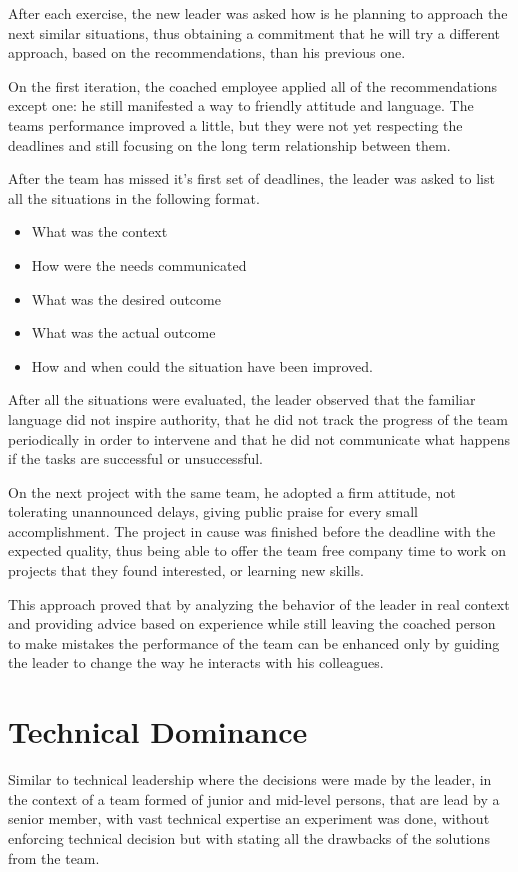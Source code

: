 After each exercise, the new leader was asked how is he planning to approach the next similar situations, thus obtaining a commitment that he will try a different approach, based on the recommendations,  than his previous one.

On the first iteration, the coached employee applied all of the recommendations except one: he still manifested a way to friendly attitude and language. The teams performance improved a little, but they were not yet respecting the deadlines and still focusing on the long term relationship between them. 

After the team has missed it's first set of deadlines, the leader was asked to list all the situations in the following format.
\begin{itemize}
\item What was the context
\item How were the needs communicated 
\item What was the desired outcome
\item What was the actual outcome
\item How and when could the situation have been improved.
\end{itemize}

After all the situations were evaluated, the leader observed that 
the familiar language did not inspire authority, that he did not track the progress of the team periodically in order to intervene and that he did not communicate what happens if the tasks are successful or unsuccessful.

On the next project with the same team, he adopted a firm attitude, not tolerating unannounced delays, giving public praise for every small accomplishment. The project in cause was finished before the deadline with the expected quality, thus being able to offer the team free company time to work on projects that they found interested, or learning new skills.

This approach proved that by analyzing the behavior of the leader in real context and providing advice based on experience while still leaving the coached person to make mistakes the performance of the team can be enhanced only by guiding the leader to change the way he interacts with his colleagues.

\section{Technical Dominance}
\label{sec:tech-dom}
Similar to technical leadership where the decisions were made by the leader, in the context of a team formed of junior and mid-level persons, that are lead by a senior member, with vast technical expertise an experiment was done, without enforcing technical decision but with stating all the drawbacks of the solutions from the team.

